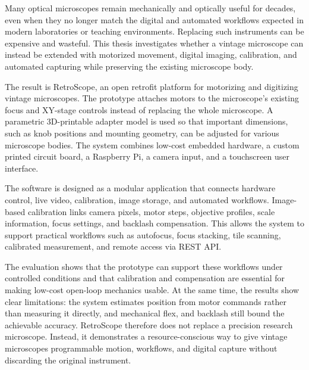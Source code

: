 Many optical microscopes remain mechanically and optically useful for decades, even when they no longer match the digital and automated workflows expected in modern laboratories or teaching environments. Replacing such instruments can be expensive and wasteful. This thesis investigates whether a vintage microscope can instead be extended with motorized movement, digital imaging, calibration, and automated capturing while preserving the existing microscope body.

The result is RetroScope, an open retrofit platform for motorizing and digitizing vintage microscopes. The prototype attaches motors to the microscope's existing focus and XY-stage controls instead of replacing the whole microscope. A parametric 3D-printable adapter model is used so that important dimensions, such as knob positions and mounting geometry, can be adjusted for various microscope bodies. The system combines low-cost embedded hardware, a custom printed circuit board, a Raspberry Pi, a camera input, and a touchscreen user interface.

The software is designed as a modular application that connects hardware control, live video, calibration, image storage, and automated workflows. Image-based calibration links camera pixels, motor steps, objective profiles, scale information, focus settings, and backlash compensation. This allows the system to support practical workflows such as autofocus, focus stacking, tile scanning, calibrated measurement, and remote access via REST API.

The evaluation shows that the prototype can support these workflows under controlled conditions and that calibration and compensation are essential for making low-cost open-loop mechanics usable. At the same time, the results show clear limitations: the system estimates position from motor commands rather than measuring it directly, and mechanical flex, and backlash still bound the achievable accuracy. RetroScope therefore does not replace a precision research microscope. Instead, it demonstrates a resource-conscious way to give vintage microscopes programmable motion, workflows, and digital capture without discarding the original instrument.
